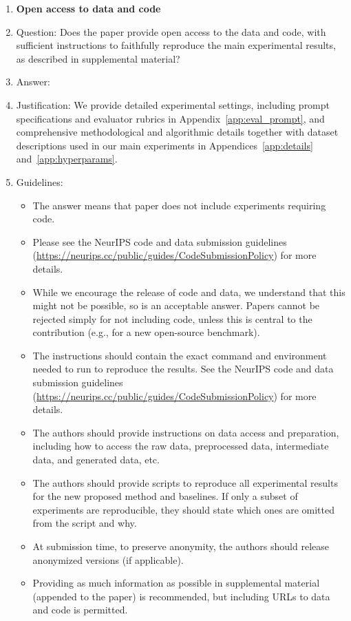 \begin{enumerate}
\item {\bf Open access to data and code}
    \item[] Question: Does the paper provide open access to the data and code, with sufficient instructions to faithfully reproduce the main experimental results, as described in supplemental material?
    \item[] Answer: \answerYes{}
    \item[] Justification: We provide detailed experimental settings, including prompt specifications and evaluator rubrics in Appendix~\ref{app:eval_prompt}, and comprehensive methodological and algorithmic details together with dataset descriptions used in our main experiments in Appendices~\ref{app:details} and~\ref{app:hyperparams}.
    \item[] Guidelines:
    \begin{itemize}
        \item The answer \answerNA{} means that paper does not include experiments requiring code.
        \item Please see the NeurIPS code and data submission guidelines (\url{https://neurips.cc/public/guides/CodeSubmissionPolicy}) for more details.
        \item While we encourage the release of code and data, we understand that this might not be possible, so \answerNo{} is an acceptable answer. Papers cannot be rejected simply for not including code, unless this is central to the contribution (e.g., for a new open-source benchmark).
        \item The instructions should contain the exact command and environment needed to run to reproduce the results. See the NeurIPS code and data submission guidelines (\url{https://neurips.cc/public/guides/CodeSubmissionPolicy}) for more details.
        \item The authors should provide instructions on data access and preparation, including how to access the raw data, preprocessed data, intermediate data, and generated data, etc.
        \item The authors should provide scripts to reproduce all experimental results for the new proposed method and baselines. If only a subset of experiments are reproducible, they should state which ones are omitted from the script and why.
        \item At submission time, to preserve anonymity, the authors should release anonymized versions (if applicable).
        \item Providing as much information as possible in supplemental material (appended to the paper) is recommended, but including URLs to data and code is permitted.
    \end{itemize}



\end{enumerate}
